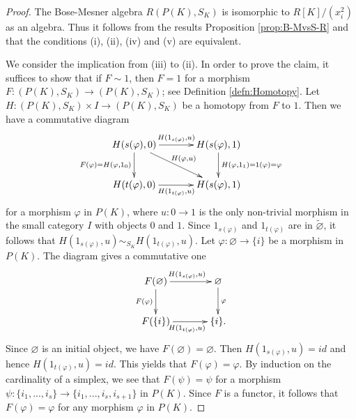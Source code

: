 \documentclass{amsart}
\theoremstyle{definition}
\theoremstyle{remark}
\newcommand{\K}{R}%
\begin{document}
\begin{proof}%
The Bose-Mesner algebra $\K(P(K), S_K)$ is isomorphic to $\K[K]/(x_i^2)$ 
as an algebra. Thus it follows from the results Proposition \ref{prop:B-MvsS-R} and  \cite[Example 5.28, page 178]{B-G} that 
the conditions (i), (ii), (iv) and (v) are equivalent. 

We consider the implication from (iii) to (ii). In order to prove the claim, it suffices to show that if
$F \sim 1$, then $F=1$ for a morphism $F : (P(K), S_K) \to (P(K), S_K)$;  
see Definition \ref{defn:Homotopy}. %
Let $H :  (P(K), S_K) \times I \to (P(K), S_K)$ be a homotopy from $F$ to $1$. 
Then we have a commutative diagram
$$
\xymatrix@C35pt@R25pt{
{H(s(\varphi), 0)}  \ar@{->}[r]^{H(1_{s(\varphi)}, u)} \ar[dr]^{H(\varphi,u)}   \ar@{->}[d]_{F(\varphi)=H(\varphi, 1_0)}  &  {H(s(\varphi), 1)}  \ar@{->}[d]^{H(\varphi, 1_1)=1(\varphi)=\varphi}\\
{H(t(\varphi), 0)} \ar@{->}[r]_{H(1_{t(\varphi)}, u)}  &  {H(s(\varphi), 1)}
}
$$
for a morphism $\varphi$ in $P(K)$, where $u :  0 \to 1$ is the only non-trivial morphism in the small category $I$ with objects $0$ and 
$1$.  Since $1_{s(\varphi)}$ and $1_{t(\varphi)}$ are in $\widetilde{\varnothing}$, it follows that 
$H(1_{s(\varphi)}, u)\sim_{S_K} H(1_{t(\varphi)}, u)$. Let $\varphi : \varnothing \to \{i\}$ be a morphism in $P(K)$. The diagram gives a commutative one 
$$
\xymatrix@C35pt@R25pt{
F(\varnothing)  \ar@{->}[r]^{H(1_{s(\varphi)}, u)}  \ar@{->}[d]_{F(\varphi)} &  \varnothing \ar@{->}[d]^{\varphi}\\
F(\{i\}) \ar@{->}[r]_{H(1_{t(\varphi)}, u)} &  \{i\}.}
$$
Since $\varnothing$ is an initial object, we have $F(\varnothing)=\varnothing$. Then 
$H(1_{s(\varphi)}, u) = id$ and hence $H(1_{t(\varphi)}, u) = id$.  This yields that $F(\varphi) = \varphi$. 
By induction on the cardinality of a simplex, we see that $F(\psi) = \psi$ for a morphism  
$\psi : \{i_1, ..., i_s\} \to \{i_1, ..., i_s, i_{s+1}\}$ in $P(K)$. 
Since $F$ is a functor, it follows that $F(\varphi)= \varphi$ for any morphism $\varphi$ in $P(K)$.


\end{proof}
\end{document}
